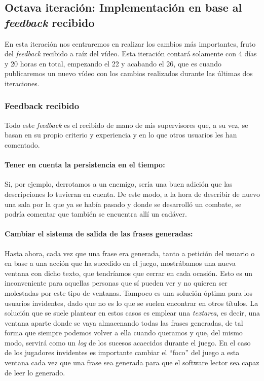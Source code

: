 \subsection{Octava iteración: Implementación en base al \textit{feedback} recibido}

En esta iteración nos centraremos en realizar los cambios más importantes, fruto del \textit{feedback} recibido a raíz del vídeo.
Esta iteración contará solamente con 4 días y 20 horas en total, empezando el 22 y acabando el 26, que es cuando publicaremos un nuevo vídeo con los cambios realizados durante las últimas dos iteraciones.

\subsubsection{Feedback recibido}

Todo este \textit{feedback} es el recibido de mano de mis supervisores que, a su vez, se basan en su propio criterio y experiencia y en lo que otros usuarios les han comentado.

\paragraph{Tener en cuenta la persistencia en el tiempo:} Si, por ejemplo, derrotamos a un enemigo, sería una buen adición que las descripciones lo tuvieran en cuenta. De este modo, a la hora de describir de nuevo una sala por la que ya se había pasado y donde se desarrolló un combate, se podría comentar que también se encuentra allí un cadáver.

\paragraph{Cambiar el sistema de salida de las frases generadas:} Hasta ahora, cada vez que una frase era generada, tanto a petición del usuario o en base a una acción que ha sucedido en el juego, mostrábamos una nueva ventana con dicho texto, que tendríamos que cerrar en cada ocasión. Esto es un inconveniente para aquellas personas que sí pueden ver y no quieren ser molestadas por este tipo de ventanas. Tampoco es una solución óptima para los usuarios invidentes, dado que no es lo que se suelen encontrar en otros títulos. La solución que se suele plantear en estos casos es emplear una \textit{textarea}, es decir, una ventana aparte donde se vaya almacenando todas las frases generadas, de tal forma que siempre podemos volver a ella cuando queramos y que, del mismo modo, servirá como un \textit{log} de los sucesos acaecidos durante el juego. En el caso de los jugadores invidentes es importante cambiar el ``foco'' del juego a esta ventana cada vez que una frase sea generada para que el software lector sea capaz de leer lo generado.

